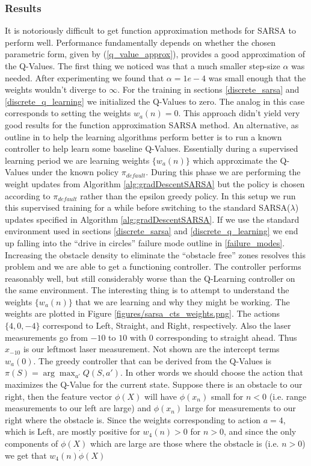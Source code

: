 \documentclass{article}
\begin{document}
\subsubsection{Results}

It is notoriously difficult to get function approximation methods for SARSA to perform well. Performance fundamentally depends on whether the chosen parametric form, given by (\ref{q_value_approx}), provides a good approximation of the Q-Values. The first thing we noticed was that a much smaller step-size $\alpha$ was needed. After experimenting we found that $\alpha = 1e-4$ was small enough that the weights wouldn't diverge to $\infty$. For the training in sections \ref{discrete_sarsa} and \ref{discrete_q_learning} we initialized the Q-Values to zero. The analog in this case corresponds to setting the weights $w_a(n) = 0$. This approach didn't yield very good results for the function approximation SARSA method. An alternative, as outline in  to help the learning algorithms perform better is to run a known controller to help learn some baseline Q-Values. Essentially during a supervised learning period we are learning weights $\{w_a(n)\}$ which approximate the Q-Values under the known policy $\pi_{default}$. During this phase we are performing the weight updates from Algorithm \ref{alg:gradDescentSARSA} but the policy is chosen according to $\pi_{default}$ rather than the epsilon greedy policy. In this setup we run this supervised training for a while before switching to the standard SARSA($\lambda$) updates specified in Algorithm \ref{alg:gradDescentSARSA}. If we use the standard environment used in sections \ref{discrete_sarsa} and \ref{discrete_q_learning} we end up falling into the ``drive in circles'' failure mode outline in \ref{failure_modes}. Increasing the obstacle density to eliminate the ``obstacle free'' zones resolves this problem and we are able to get a functioning controller. The controller performs reasonably well, but still considerably worse than the Q-Learning controller on the same environment. The interesting thing is to attempt to understand the weights $\{w_a(n)\}$ that we are learning and why they might be working. The weights are plotted in Figure \ref{figures/sarsa_cts_weights.png}. The actions $\{4,0,-4\}$ correspond to Left, Straight, and Right, respectively. Also the laser measurements go from $-10$ to $10$ with $0$ corresponding to straight ahead. Thus $x_{-10}$ is our leftmost laser measurement. Not shown are the intercept terms $w_a(0)$. The greedy controller that can be derived from the Q-Values is $\pi(S) = \arg \max_{a'} Q(S,a')$. In other words we should choose the action that maximizes the Q-Value for the current state. Suppose there is an obstacle to our right, then the feature vector $\phi(X)$ will have $\phi(x_n)$ small for $n < 0$ (i.e. range measurements to our left are large) and $\phi(x_n)$ large for measurements to our right where the obstacle is. Since the weights corresponding to action $a = 4$, which is Left, are mostly positive for $w_4(n) > 0$ for $n > 0$, and since the only components of $\phi(X)$ which are large are those where the obstacle is (i.e. $n > 0$) we get that $w_{4}(n) \dot \phi(X)$ 
\end{document}
